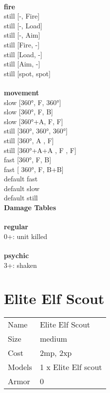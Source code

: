 \ \\ {\bf fire } \\
still [-, Fire] \\
still [-, Load] \\
still [-, Aim] \\
still [Fire, -] \\
still [Load, -] \\
still [Aim, -] \\
still [spot, spot] \\
\ \\ {\bf movement } \\
slow [360°, F, 360°] \\
slow [360°, F, B] \\
slow [360°+A, F, F] \\
still [360°, 360°, 360°] \\
still [360°, A , F] \\
still [360°+A+A , F , F] \\
fast [360°, F, B] \\
fast [ 360°,  F, B+B] \\
default fast \\
default slow \\
default still \\


{\bf Damage Tables} \\
\ \\ {\bf regular } \\
0+: unit killed \\
\ \\ {\bf psychic } \\
3+: shaken \\










\pagebreak\pagebreak

\section{ Elite Elf Scout }

\begin{tabular}{ll}
  Name & Elite Elf Scout \\
  Size & medium\\
  Cost & 2mp, 2xp\\
  Models & 1 x Elite Elf scout\\
  Armor & 0\\
\end{tabular}

